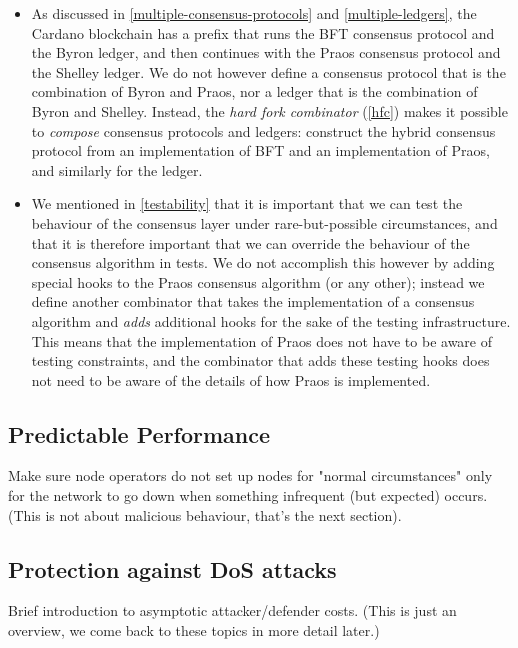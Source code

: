 \begin{itemize}
\item As discussed in \cref{multiple-consensus-protocols} and
\cref{multiple-ledgers}, the Cardano blockchain has a prefix that runs the BFT
consensus protocol and the Byron ledger, and then continues with the Praos
consensus protocol and the Shelley ledger. We do not however define a consensus
protocol that is the combination of Byron and Praos, nor a ledger that is the
combination of Byron and Shelley. Instead, the \emph{hard fork combinator}
(\cref{hfc}) makes it possible to \emph{compose} consensus protocols and
ledgers: construct the hybrid consensus protocol from an implementation of BFT
and an implementation of Praos, and similarly for the ledger.

\item We mentioned in \cref{testability} that it is important that we can
test the behaviour of the consensus layer under rare-but-possible circumstances,
and that it is therefore important that we can override the behaviour of the
consensus algorithm in tests. We do not accomplish this however by adding
special hooks to the Praos consensus algorithm (or any other); instead we define
another combinator that takes the implementation of a consensus algorithm and
\emph{adds} additional hooks for the sake of the testing infrastructure. This
means that the implementation of Praos does not have to be aware of testing
constraints, and the combinator that adds these testing hooks does not need to
be aware of the details of how Praos is implemented.
\end{itemize}

\subsection{Predictable Performance}

Make sure node operators do not set up nodes for "normal circumstances" only
for the network to go down when something infrequent (but expected) occurs.
(This is not about malicious behaviour, that's the next section).

\duncan

\subsection{Protection against DoS attacks}

Brief introduction to asymptotic attacker/defender costs. (This is just an
overview, we come back to these topics in more detail later.)

\duncan
